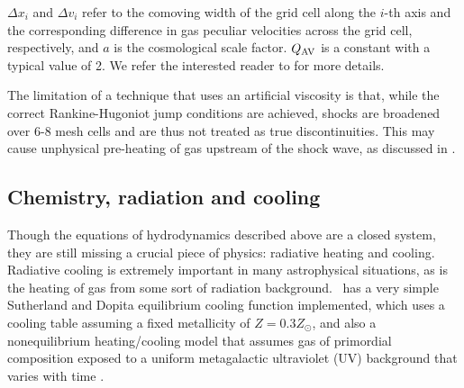 $\Delta x_i$ and $\Delta v_{i}$ refer to the comoving 
width of the grid cell
along the $i$-th axis and the corresponding difference in gas
peculiar velocities across the grid cell, respectively, and $a$ is the
cosmological scale factor.  $Q_{\rm AV}$ is a constant with a typical
value of 2. We refer the interested reader to \citet{1994ApJ...429..434A} for more details.

The limitation of a technique that uses an artificial viscosity is that,
while the correct Rankine-Hugoniot jump conditions are achieved,
shocks are broadened over 6-8 mesh cells and are thus not treated as true
discontinuities. This may cause unphysical pre-heating of gas upstream
of the shock wave, as discussed in \citet{1994ApJ...429..434A}.

\subsection{Chemistry, radiation and cooling}
\label{sec.ov.chem}


Though the equations of hydrodynamics described above are a closed system,
they are still missing a crucial piece of physics: radiative heating and cooling.
Radiative cooling is extremely important in many astrophysical situations, as is 
the heating of gas from some sort of radiation background.  \enzo\ has a very simple
Sutherland and Dopita equilibrium cooling function \citep{1993ApJS...88..253S} 
implemented, which uses a
cooling table assuming a fixed metallicity of $Z = 0.3 Z_\odot$, and also a
nonequilibrium heating/cooling model that assumes gas of primordial composition exposed to a
uniform metagalactic ultraviolet (UV) background that varies with time \citep{1996ApJS..105...19K}.  

